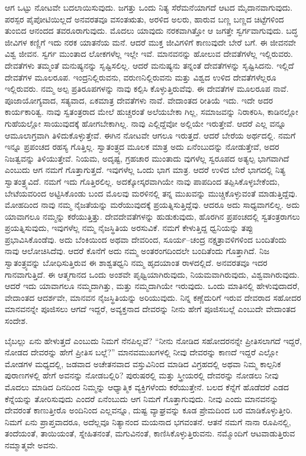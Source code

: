 ಆಗ ಒಟ್ಟು ನೋಟವೇ ಬದಲಾಯಿಸುವುದು. ಜಗತ್ತು ಒಂದು ನಿತ್ಯ ಸೆರೆಮನೆಯಾಗದೆ ಆಟದ ಮೈದಾನವಾಗುವುದು. ಪರಸ್ಪರ ಪೈಪೋಟಿಯಿಲ್ಲದೆ ಅನವರತವೂ ವಸಂತಋತು, ಅರಳಿದ ಅಲರು, ಹಾರುವ ಬಣ್ಣ ಬಣ್ಣದ ಚಿಟ್ಟೆಗಳಿಂದ ತುಂಬಿದ ಆನಂದದ ತವರೂರಾಗುವುದು. ಮೊದಲು ಯಾವುದು ನರಕವಾಗಿತ್ತೋ ಆ ಜಗತ್ತೇ ಸ್ವರ್ಗವಾಗುವುದು. ಬದ್ಧ ಜೀವಿಗಳ ಕಣ್ಣಿಗೆ ಇದು ನರಕ ಯಾತನೆಯ ಮನೆ. ಆದರೆ ಮುಕ್ತ ಜೀವಿಗಳಿಗೆ ಕಾಣುವುದೇ ಬೇರೆ ಬಗೆ. ಈ ಜೀವನವೇ ವಿಶ್ವ ಜೀವನ. ಸ್ವರ್ಗ ಮುಂತಾದ ಲೋಕಗಳೆಲ್ಲ ಇಲ್ಲೇ ಇವೆ. ಮಾನವನನ್ನು ಹೋಲುವ ದೇವತೆಗಳೆಲ್ಲ ಇಲ್ಲಿರುವರು. ದೇವತೆಗಳು ತಮ್ಮಂತೆ ಮನುಷ್ಯನನ್ನು ಸೃಷ್ಟಿಸಲಿಲ್ಲ. ಆದರೆ ಮನುಷ್ಯನು ತನ್ನಂತೆ ದೇವತೆಗಳನ್ನು ಸೃಷ್ಟಿಸಿದನು. ಇಲ್ಲಿದೆ ದೇವತೆಗಳ ಮೂಲರೂಪ. ಇಂದ್ರನಿಲ್ಲಿರುವನು, ವರುಣನಿಲ್ಲಿರುವನು ಮತ್ತು ವಿಶ್ವದ ಉಳಿದ ದೇವತೆಗಳೆಲ್ಲರೂ ಇಲ್ಲಿರುವರು. ನಮ್ಮ ಅಲ್ಪ ಪ್ರತಿರೂಪಗಳನ್ನು ನಾವು ಕಲ್ಪಿಸಿ ಕೊಳ್ಳುತ್ತಿರುವೆವು. ಈ ದೇವತೆಗಳ ಮೂಲರೂಪ ನಾವೆ. ಪೂಜಾಯೋಗ್ಯವಾದ, ಸತ್ಯವಾದ, ಏಕಮಾತ್ರ ದೇವತೆಗಳು ನಾವೆ. ವೇದಾಂತದ ರೀತಿಯೆ ಇದು. ಇದೇ ಅದರ ಕಾರ್ಯಕಾರಿತ್ವ. ನಾವು ಸ್ವತಂತ್ರರಾದ ಮೇಲೆ ಹುಚ್ಚರಂತೆ ಅಲೆಯಬೇಕಾ ಗಿಲ್ಲ, ಸಮಾಜವನ್ನು ನಿರಾಕರಿಸಿ, ಕಾಡಿನಲ್ಲೋ ಗುಹೆಯಲ್ಲೋ ಸಾಯುವುದಕ್ಕೆ ಹೋಗಬೇಕಾಗಿಲ್ಲ. ನಾವು ಎಲ್ಲಿದ್ದೆವೋ ಅಲ್ಲಿಯೇ ಇರುತ್ತೇವೆ. ಆದರೆ ಎಲ್ಲ ವನ್ನೂ ಆಮೂಲಾಗ್ರವಾಗಿ ತಿಳಿದುಕೊಳ್ಳುತ್ತೇವೆ. ಈಗಿನ ನೋಟವೇ ಆಗಲೂ ಇರುತ್ತದೆ. ಆದರೆ ಬೇರೆಯ ಅರ್ಥದಲ್ಲಿ. ನಮಗೆ ಇನ್ನೂ ಪ್ರಪಂಚದ ರಹಸ್ಯ ಗೊತ್ತಿಲ್ಲ. ಸ್ವಾತಂತ್ರ್ಯದ ಮೂಲಕ ಮಾತ್ರ ಅದು ಏನೆಂಬುದನ್ನು ನೋಡುತ್ತೇವೆ, ಅದರ ನಿಜತ್ವವನ್ನು ತಿಳಿಯುತ್ತೇವೆ. ನಿಯಮ, ಅದೃಷ್ಟ, ಗ್ರಹಚಾರ ಮುಂತಾದು ವುಗಳೆಲ್ಲ ಸ್ವರೂಪದ ಅತ್ಯಲ್ಪ ಭಾಗವಾಗಿದೆ ಎಂಬುದು ಆಗ ನಮಗೆ ಗೊತ್ತಾಗುತ್ತದೆ. ಇವುಗಳೆಲ್ಲ ಒಂದು ಭಾಗ ಮಾತ್ರ. ಆದರೆ ಉಳಿದ ಬೇರೆ ಭಾಗದಲ್ಲಿ ನಿತ್ಯ ಸ್ವಾತಂತ್ರ್ಯವಿದೆ. ನಮಗೆ ಇದು ಗೊತ್ತಿರಲಿಲ್ಲ. ಅದಕ್ಕೋಸ್ಕರವಾಗಿಯೇ ನಾವು ಪಾಪದಿಂದ ತಪ್ಪಿಸಿಕೊಳ್ಳಬೇಕೆಂದು, ಬೇಟೆಯವರಿಂದ ಅಟ್ಟಿಸಿಕೊಂಡು ಬಂದ ಮೊಲವು ಮರಳಿನಲ್ಲಿ ತನ್ನ ಮುಖವನ್ನು ಮುಚ್ಚಿಕೊಳ್ಳುವಂತೆ ಮಾಡುತ್ತಿದ್ದೆವು. ಮೋಹದಿಂದ ನಾವು ನಮ್ಮ ನೈಜತೆಯನ್ನು ಮರೆಯುವುದಕ್ಕೆ ಪ್ರಯತ್ನಿಸುತ್ತಿದ್ದೆವು. ಆದರೂ ಅದು ಸಾಧ್ಯವಾಗಲಿಲ್ಲ. ಅದು ಯಾವಾಗಲೂ ನಮ್ಮನ್ನು ಕರೆಯುತ್ತಿತ್ತು. ದೇವದೇವತೆಗಳನ್ನು ಹುಡುಕುವುದು, ಹೊರಗಿನ ಪ್ರಪಂಚದಲ್ಲಿ ಸ್ವತಂತ್ರರಾಗಲು ಪ್ರಯತ್ನಿಸುವುದು, ಇವುಗಳೆಲ್ಲ ನಮ್ಮ ನೈಜಸ್ಥಿತಿಯ ಅರಸುವಿಕೆ. ನಮಗೆ ಕೇಳುತ್ತಿದ್ದ ಧ್ವನಿಯನ್ನು ತಪ್ಪು ಪ್ರಭಾವಿಸಿಕೊಂಡೆವು. ಅದು ಬೆಂಕಿಯಿಂದ ಅಥವಾ ದೇವರಿಂದ, ಸೂರ್ಯ–ಚಂದ್ರ ನಕ್ಷತ್ರಾವಳಿಗಳಿಂದ ಬಂದಿತೆಂದು ನಾವು ಆಲೋಚಿಸಿದೆವು. ಆದರೆ ಕೊನೆಗೆ ಅದು ನಮ್ಮ ಅಂತರಂಗದಿಂದಲೇ ಬಂದಿತೆಂದು ಗೊತ್ತಾಗಿದೆ. ನಿಜ ಸ್ವಾತಂತ್ರ್ಯವನ್ನು ಬೋಧಿಸುತ್ತಿರುವ ಈ ಶಾಶ್ವತಧ್ವನಿ ನಮ್ಮ ಹೃದಯಾಂತ ರಾಳದಲ್ಲಿದೆ. ಅನವರತವೂ ಇದರ ಗಾನವಾಗುತ್ತಿದೆ. ಈ ಆತ್ಮಗಾನದ ಒಂದು ಅಂಶವೇ ಪೃಥ್ವಿಯಾಗಿರುವುದು, ನಿಯಮವಾಗಿರುವುದು, ವಿಶ್ವವಾಗಿರುವುದು. ಆದರೆ ಇದು ಯಾವಾಗಲೂ ನಮ್ಮದಾಗಿತ್ತು, ಮತ್ತು ನಮ್ಮದಾಗಿಯೇ ಇರುವುದು. ಒಂದು ಮಾತಿನಲ್ಲಿ ಹೇಳುವುದಾದರೆ, ವೇದಾಂತದ ಆದರ್ಶವೇ, ಮಾನವನ ನೈಜಸ್ಥಿತಿಯನ್ನು ಅರಿಯುವುದು. ನಿನ್ನ ಕಣ್ಣೆದುರಿಗೆ ಇರುವ ದೇವರಾದ ಸಹೋದರ ಮಾನವನನ್ನೇ ಪೂಜಿಸಲು ಆಗದೆ ಇದ್ದರೆ, ಅವ್ಯಕ್ತನಾದ ದೇವರನ್ನು ನೀನು ಹೇಗೆ ಪೂಜಿಸಬಲ್ಲೆ ಎಂಬುದೇ ವೇದಾಂತದ ಸಂದೇಶ.

ಬೈಬಲ್ಲು ಏನು ಹೇಳುತ್ತದೆ ಎಂಬುದು ನಿಮಗೆ ನೆನಪಿಲ್ಲವೆ? “ನೀನು ನೋಡಿದ ಸಹೋದರನನ್ನೇ ಪ್ರೀತಿಸಲಾಗದೆ ಇದ್ದರೆ, ನೋಡದ ದೇವರನ್ನು ಹೇಗೆ ಪ್ರೀತಿಸ ಬಲ್ಲೆ?” ಮಾನವಮುಖಗಳಲ್ಲಿ ನೀವು ದೇವರನ್ನು ಕಾಣದೆ ಇದ್ದರೆ ಎಲ್ಲೋ ಮೋಡಗಳ ಮಧ್ಯದಲ್ಲಿ, ಜಡವಾದ ಅಚೇತನವಾದ ವಸ್ತುವಿನಿಂದ ಮಾಡಿದ ವಿಗ್ರಹದಲ್ಲಿ ಅಥವಾ ನಿಮ್ಮ ಕಾಲ್ಪನಿಕ ಪುರಾಣಗಳಲ್ಲಿ ಹೇಗೆ ಅವನನ್ನು ನೋಡಬಲ್ಲಿರಿ? ಪುರುಷರಲ್ಲಿ ಮತ್ತು ಸ್ತ್ರೀಯರಲ್ಲಿ ದೇವರನ್ನು ನೋಡಲು ನೀವು ಮೊದಲು ಮಾಡಿದ ದಿನದಿಂದ ನಿಮ್ಮನ್ನು ಆಧ್ಯಾತ್ಮಿಕ ವ್ಯಕ್ತಿಗಳೆಂದು ಕರೆಯುತ್ತೇನೆ. ಬಲದ ಕೆನ್ನೆಗೆ ಹೊಡೆದರೆ ಎಡದ ಕೆನ್ನೆಯನ್ನು ತೋರಿಸುವುದು ಎಂದರೆ ಏನೆಂಬುದು ಆಗ ನಿಮಗೆ ಗೊತ್ತಾಗುವುದು. ನೀವು ಎಂದು ಮಾನವನನ್ನು ದೇವರಂತೆ ಕಾಣುತ್ತೀರೊ ಅಂದಿನಿಂದ ಎಲ್ಲವನ್ನೂ, ದುಷ್ಟ ವ್ಯಾಘ್ರವನ್ನು ಕೂಡ ಪ್ರೇಮದಿಂದ ಬರ ಮಾಡಿಕೊಳ್ಳುತ್ತೀರಿ. ನಿಮಗೆ ಏನು ಪ್ರಾಪ್ತವಾದರೂ, ಅದೆಲ್ಲವೂ ನಿತ್ಯಾನಂದ ಮಯನಾದ ಭಗವಂತನೆ. ಆತನೆ ನಮಗೆ ನಾನಾ ರೂಪಿನಲ್ಲಿ, ತಂದೆಯಂತೆ, ತಾಯಿಯಂತೆ, ಸ್ನೇಹಿತನಂತೆ, ಮಗುವಿನಂತೆ, ಕಾಣಿಸಿಕೊಳ್ಳುತ್ತಿರುವನು. ನಮ್ಮೊಂದಿಗೆ ಆಟವಾಡುತ್ತಿರುವ ನಮ್ಮಾತ್ಮವೇ ಅವನು.

